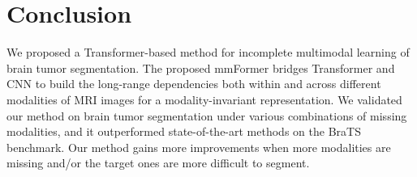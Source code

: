 \documentclass[runningheads]{llncs}
\begin{document}
\section{Conclusion}
\label{sec:concolusion}

We proposed a Transformer-based method for incomplete multimodal learning of brain tumor segmentation. The proposed mmFormer bridges Transformer and CNN to build the long-range dependencies both within and across different modalities of MRI images for a modality-invariant representation. We validated our method on brain tumor segmentation under various combinations of missing modalities, and it outperformed state-of-the-art methods on the BraTS benchmark. Our method gains more improvements when more modalities are missing and/or the target ones are more difficult to segment.





\end{document}
